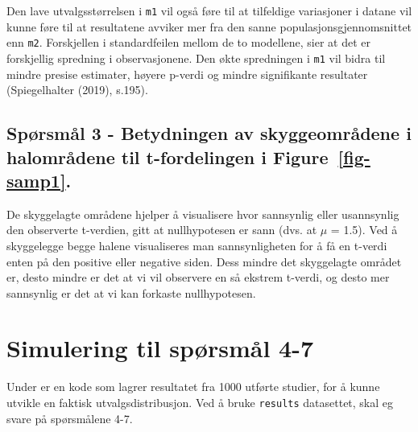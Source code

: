 \documentclass[
  letterpaper,
  DIV=11,
  numbers=noendperiod]{scrreprt}
\begin{document}
Den lave utvalgsstørrelsen i \texttt{m1} vil også føre til at tilfeldige
variasjoner i datane vil kunne føre til at resultatene avviker mer fra
den sanne populasjonsgjennomsnittet enn \texttt{m2}. Forskjellen i
standardfeilen mellom de to modellene, sier at det er forskjellig
spredning i observasjonene. Den økte spredningen i \texttt{m1} vil bidra
til mindre presise estimater, høyere p-verdi og mindre signifikante
resultater (Spiegelhalter (2019), s.195).

\section{\texorpdfstring{Spørsmål 3 - Betydningen av skyggeområdene i
halområdene til t-fordelingen i
Figure~\ref{fig-samp1}.}{Spørsmål 3 - Betydningen av skyggeområdene i halområdene til t-fordelingen i Figure~.}}\label{spuxf8rsmuxe5l-3---betydningen-av-skyggeomruxe5dene-i-halomruxe5dene-til-t-fordelingen-i-fig-samp1.}

De skyggelagte områdene hjelper å visualisere hvor sannsynlig eller
usannsynlig den observerte t-verdien, gitt at nullhypotesen er sann
(dvs. at \(\mu\) = 1.5). Ved å skyggelegge begge halene visualiseres man
sannsynligheten for å få en t-verdi enten på den positive eller negative
siden. Dess mindre det skyggelagte området er, desto mindre er det at vi
vil observere en så ekstrem t-verdi, og desto mer sannsynlig er det at
vi kan forkaste nullhypotesen.


\chapter{Simulering til spørsmål
4-7}\label{simulering-til-spuxf8rsmuxe5l-4-7}

Under er en kode som lagrer resultatet fra 1000 utførte studier, for å
kunne utvikle en faktisk utvalgsdistribusjon. Ved å bruke
\texttt{results} datasettet, skal eg svare på spørsmålene 4-7.
\end{document}

